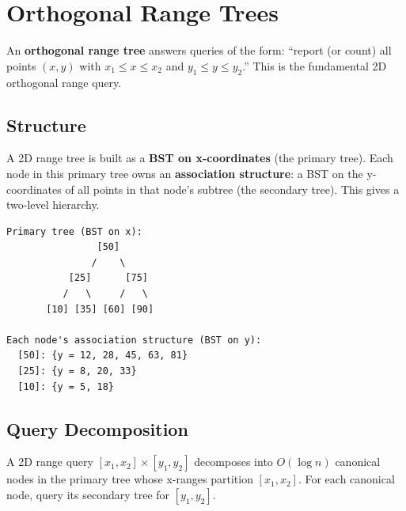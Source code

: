 \section{Orthogonal Range Trees}
\label{sec:orthogonal-range}

An \textbf{orthogonal range tree} answers queries of the form: ``report (or count) all points $(x, y)$ with $x_1 \le x \le x_2$ and $y_1 \le y \le y_2$.'' This is the fundamental 2D orthogonal range query.

\subsection{Structure}

A 2D range tree is built as a \textbf{BST on x-coordinates} (the primary tree). Each node in this primary tree owns an \textbf{association structure}: a BST on the y-coordinates of all points in that node's subtree (the secondary tree). This gives a two-level hierarchy.

\begin{lstlisting}
Primary tree (BST on x):
                [50]
               /    \
           [25]      [75]
          /   \     /   \
       [10] [35] [60] [90]

Each node's association structure (BST on y):
  [50]: {y = 12, 28, 45, 63, 81}
  [25]: {y = 8, 20, 33}
  [10]: {y = 5, 18}
\end{lstlisting}

\subsection{Query Decomposition}

A 2D range query $[x_1, x_2] \times [y_1, y_2]$ decomposes into $O(\log n)$ canonical nodes in the primary tree whose x-ranges partition $[x_1, x_2]$. For each canonical node, query its secondary tree for $[y_1, y_2]$.

